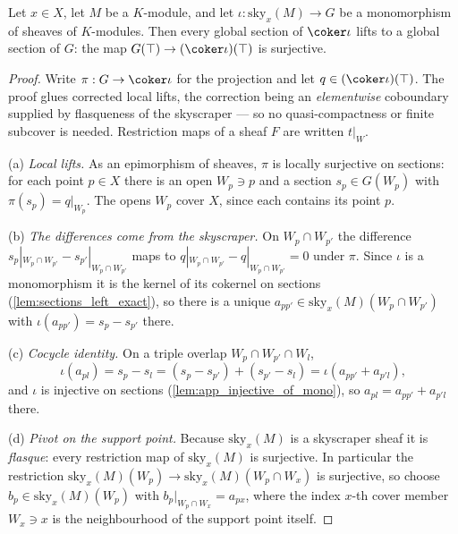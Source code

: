 \begin{theorem}
  \label{thm:sky_cokernel_app_top_surjective}
  \leanok
  Let \(x \in X\), let \(M\) be a \(K\)-module, and let \(\iota : \mathrm{sky}_x(M) \to G\) be a
  monomorphism of sheaves of \(K\)-modules. Then every global section of \(\coker \iota\) lifts
  to a global section of \(G\): the map \(G(\top) \to (\coker \iota)(\top)\) is surjective.
\end{theorem}
\begin{proof}
  \leanok
  Write \(\pi : G \to \coker \iota\) for the projection and let \(q \in (\coker \iota)(\top)\).
  The proof glues corrected local lifts, the correction being an \emph{elementwise} coboundary
  supplied by flasqueness of the skyscraper --- so no quasi-compactness or finite subcover is
  needed. Restriction maps of a sheaf \(F\) are written \(t|_W\).

  (a) \emph{Local lifts.} As an epimorphism of sheaves, \(\pi\) is locally surjective on
  sections: for each point \(p \in X\) there is an open \(W_p \ni p\) and a section
  \(s_p \in G(W_p)\) with \(\pi(s_p) = q|_{W_p}\). The opens \(W_p\) cover \(X\), since each
  contains its point \(p\).

  (b) \emph{The differences come from the skyscraper.} On \(W_p \cap W_{p'}\) the difference
  \(s_p|_{W_p \cap W_{p'}} - s_{p'}|_{W_p \cap W_{p'}}\) maps to
  \(q|_{W_p \cap W_{p'}} - q|_{W_p \cap W_{p'}} = 0\) under \(\pi\). Since \(\iota\) is a
  monomorphism it is the kernel of its cokernel on sections (\ref{lem:sections_left_exact}), so
  there is a unique \(a_{pp'} \in \mathrm{sky}_x(M)(W_p \cap W_{p'})\) with
  \(\iota(a_{pp'}) = s_p - s_{p'}\) there.

  (c) \emph{Cocycle identity.} On a triple overlap \(W_p \cap W_{p'} \cap W_l\),
  \[
    \iota(a_{pl}) = s_p - s_l = (s_p - s_{p'}) + (s_{p'} - s_l) = \iota(a_{pp'} + a_{p'l}) ,
  \]
  and \(\iota\) is injective on sections (\ref{lem:app_injective_of_mono}), so
  \(a_{pl} = a_{pp'} + a_{p'l}\) there.

  (d) \emph{Pivot on the support point.} Because \(\mathrm{sky}_x(M)\) is a skyscraper sheaf it
  is \emph{flasque}: every restriction map of \(\mathrm{sky}_x(M)\) is surjective. In particular
  the restriction \(\mathrm{sky}_x(M)(W_p) \to \mathrm{sky}_x(M)(W_p \cap W_x)\) is surjective,
  so choose \(b_p \in \mathrm{sky}_x(M)(W_p)\) with \(b_p|_{W_p \cap W_x} = a_{px}\), where the
  index \(x\)-th cover member \(W_x \ni x\) is the neighbourhood of the support point itself.


\end{proof}
